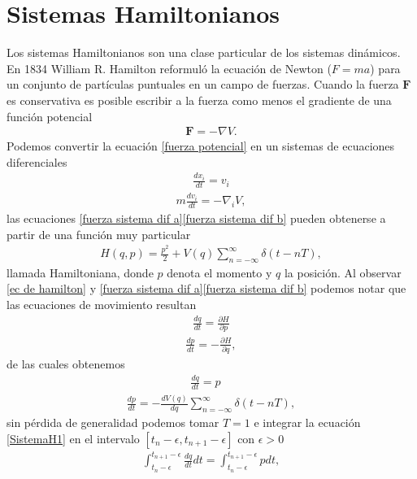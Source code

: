 \section{Sistemas Hamiltonianos}
Los sistemas Hamiltonianos son una clase particular de los sistemas dinámicos. En 1834 William R. Hamilton reformuló la ecuación de Newton ($F=ma$) para un conjunto de partículas puntuales en un campo de fuerzas. Cuando la fuerza $\mathbf{F}$ es conservativa es posible escribir a la fuerza como  menos el gradiente de una función potencial
\begin{eqnarray}
\mathbf{F}=-\nabla V. \label{fuerza potencial}
\end{eqnarray}
Podemos convertir la ecuación \eqref{fuerza potencial} en un sistemas de ecuaciones diferenciales
\begin{eqnarray}
\frac{dx_{i}}{dt}=v_{i}
\label{fuerza sistema dif a}
\end{eqnarray}
\begin{eqnarray}
m\frac{dv_{i}}{dt}=-\nabla_{i} V,
\label{fuerza sistema dif b}
\end{eqnarray}
las ecuaciones \eqref{fuerza sistema dif a}\eqref{fuerza sistema dif b} pueden obtenerse a partir de una función muy particular
\begin{eqnarray}
H(q,p)=\frac{p^{2}}{2}+V(q)\sum_{n=-\infty}^{\infty}\delta(t-nT), 
\label{ec de hamilton} 
\end{eqnarray}
llamada Hamiltoniana, donde $p$ denota el momento y $q$ la posición. Al observar \eqref{ec de hamilton} y \eqref{fuerza sistema dif a}\eqref{fuerza sistema dif b} podemos notar que las ecuaciones de movimiento resultan
\begin{eqnarray}
\frac{dq}{dt}=\frac{\partial H}{\partial p}
\label{1ec de mov}
\end{eqnarray}
\begin{eqnarray}
\frac{dp}{dt}=-\frac{\partial H}{\partial q},
\label{2ec de mov}
\end{eqnarray}
de las cuales obtenemos 
\begin{eqnarray}
\frac{dq}{dt}=p\quad
\label{SistemaH1}
\end{eqnarray}
\begin{eqnarray}
\frac{dp}{dt}=-\frac{dV(q)}{dq}\sum_{n=-\infty}^{\infty}\delta(t-nT),
\label{SistemaH2}
\end{eqnarray}
sin pérdida de generalidad podemos tomar $T=1$ e integrar la ecuación \eqref{SistemaH1} en el intervalo $[t_{n}-\epsilon,t_{n+1}-\epsilon]$ con $\epsilon>0$
\begin{eqnarray}
\int_{t_{n}-\epsilon}^{t_{n+1}-\epsilon}\frac{dq}{dt}dt=\int_{t_{n}-\epsilon}^{t_{n+1}-\epsilon}pdt,
\label{integral1}
\end{eqnarray}
